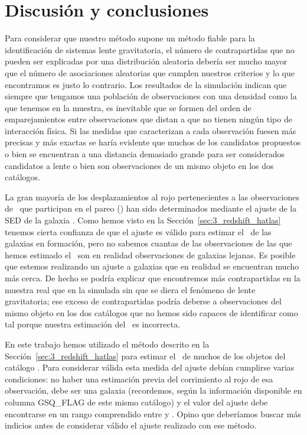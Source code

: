 \section{Discusión y conclusiones}\label{sec:7_conclusiones}

Para considerar que nuestro método supone un método fiable para la identificación de sistemas lente gravitatoria, el número de contrapartidas que no pueden ser explicadas por una distribución aleatoria debería ser mucho mayor que el número de asociaciones aleatorias que cumplen nuestros criterios y lo que encontramos es justo lo contrario. Los resultados de la simulación indican que siempre que tengamos una población de observaciones con una densidad como la que tenemos en la muestra, es inevitable que se formen del orden de  emparejamientos entre observaciones que distan a  que no tienen ningún tipo de interacción física. Si las medidas que caracterizan a cada observación fuesen más precisas y más exactas se haría evidente que muchos de los candidatos propuestos o bien se encuentran a una distancia demasiado grande para ser considerados candidatos a lente o bien son observaciones de un mismo objeto en los dos catálogos.

La gran mayoría de los desplazamientos al rojo pertenecientes a las observaciones de \hatlas\ que participan en el pareo () han sido determinados mediante el ajuste de la SED de la galaxia \smm. Como hemos visto en la Sección~\ref{sec:3_redshift_hatlas} tenemos cierta confianza de que el ajuste es válido para estimar el \rt\ de las galaxias en formación, pero no sabemos cuantas de las observaciones de las que hemos estimado el \rt\ son en realidad observaciones de galaxias lejanas. Es posible que estemos realizando un ajuste a galaxias que en realidad se encuentran mucho más cerca. De hecho se podría explicar que encontremos más contrapartidas en la muestra real que en la simulada sin que se diera el fenómeno de lente gravitatoria; ese exceso de contrapartidas podría deberse a observaciones del mismo objeto en los dos catálogos que no hemos sido capaces de identificar como tal porque nuestra estimación del \rt\ es incorrecta.

En este trabajo hemos utilizado el método descrito en la Sección~\ref{sec:3_redshift_hatlas} para estimar el \rt\ de muchos de los objetos del catálogo \hatlas. Para considerar válida esta medida del ajuste debían cumplirse varias condiciones: no haber una estimación previa del corrimiento al rojo de esa observación, debe ser una galaxia (recordemos, según la información disponible en columna GSQ\_FLAG de este mismo catálogo) y el valor del ajuste debe encontrarse en un rango comprendido entre  y . Opino que deberíamos buscar más indicios antes de considerar válido el ajuste realizado con ese método. 


